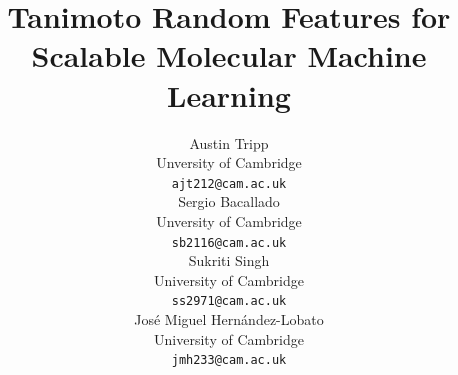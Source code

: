 


\usepackage[final]{neurips_2023}  %

\usepackage[utf8]{inputenc} %
\usepackage[T1]{fontenc}    %
\usepackage[hidelinks]{hyperref}       %
\usepackage{url}            %
\usepackage{booktabs}       %
\usepackage{amsmath}
\usepackage{amsfonts}       %
\usepackage{amsthm}       %
\usepackage{nicefrac}       %
\usepackage{microtype}      %
\usepackage{cleveref}
\usepackage[disable]{todonotes}
\usepackage{xcolor}         %
\usepackage{verbatim}

\theoremstyle{plain}
\newtheorem*{theorem*}{Theorem}
\newtheorem{theorem}{Theorem}[section]
\newtheorem{proposition}[theorem]{Proposition}
\newtheorem{lemma}[theorem]{Lemma}
\newtheorem*{lemma*}{Lemma}
\newtheorem{corollary}[theorem]{Corollary}
\theoremstyle{definition}
\newtheorem{definition}[theorem]{Definition}
\newtheorem{assumption}[theorem]{Assumption}
\theoremstyle{remark}
\newtheorem{remark}[theorem]{Remark}



\newcommand{\fracpartial}[2]{\frac{\partial #1}{\partial  #2}}
\newcommand{\numeq}[1]{\begin{align}#1\end{align}}
\newcommand{\eq}[1]{\begin{align*}#1\end{align*}}
\newcommand{\E}{\mathbb{E}}
\newcommand{\p}{\mathbb{P}}
\newcommand{\R}{\mathbb{R}}
\newcommand{\Z}{\mathbb{Z}}
\newcommand{\Var}{\textnormal{Var}}
\newcommand{\Tr}{\textnormal{Tr}}
\DeclareMathOperator*{\argmin}{arg\,min}
\DeclareMathOperator*{\argmax}{arg\,max}
\newcommand{\SF}{\textcolor{red}} 
\newcommand{\LT}{\textcolor{blue}} 
\renewcommand{\Pr}{\mathbb{P}}

\title{Tanimoto Random Features for Scalable Molecular Machine Learning}
\author{%
  Austin Tripp \\
  Unversity of Cambridge \\
  \texttt{ajt212@cam.ac.uk} \\
  \And
  Sergio Bacallado \\
  Unversity of Cambridge \\
  \texttt{sb2116@cam.ac.uk} \\
  \AND
  Sukriti Singh \\
  University of Cambridge \\
  \texttt{ss2971@cam.ac.uk} \\
  \And
  José Miguel Hernández-Lobato \\
  University of Cambridge \\
  \texttt{jmh233@cam.ac.uk} \\
}

\newcommand{\arxivURL}{\url{http://arxiv.org/abs/2306.14809}}
\newcommand{\codeURL}{https://github.com/AustinT/tanimoto-random-features-neurips23}